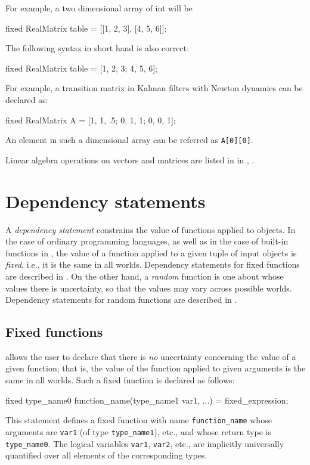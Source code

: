 \documentclass[12pt]{article}
\begin{document}
For example, a two dimensional array of int will be
\begin{blogcode}
fixed RealMatrix table = [[1, 2, 3], [4, 5, 6]];
\end{blogcode}
The following syntax in short hand is also correct:
\begin{blogcode}
fixed RealMatrix table = [1, 2, 3; 4, 5, 6];
\end{blogcode}


For example, a transition matrix in Kalman filters with Newton dynamics can be declared as:
\begin{blogcode}
fixed RealMatrix A = [1, 1, .5; 0, 1, 1; 0, 0, 1];
\end{blogcode}
An element in such a dimensional array can be referred as \texttt{A[0][0]}.



Linear algebra operations on vectors and matrices are listed in
in , .


\section{Dependency statements}\label{dependency-section}

A {\em dependency statement} constrains the value of functions applied to objects. In the case of ordinary programming languages,
as well as in the case of built-in functions in \bl, the value of a function applied to a given tuple of input objects is {\em fixed},
i.e., it is the same in all worlds. Dependency statements for fixed functions are described in . On the other hand, a {\em random} function
is one about whose values there is uncertainty, so that the values may vary across possible worlds. Dependency statements for random functions are described in .

\subsection{Fixed functions}\label{fixed-section}

\bl allows the user to declare that there is {\em no} uncertainty concerning the value of a given function; that is, the
value of the function applied to given arguments is the same in all worlds. Such a fixed function is declared as follows:
\begin{blogcode}
fixed type_name0 function_name(type_name1 var1, ...) = 
  fixed_expression;
\end{blogcode}
This statement defines a fixed function with name \texttt{function\_name} whose arguments are {\tt var1} (of type \verb|type_name1|), etc.,
and whose return type is \verb|type_name0|. The logical variables {\tt var1}, {\tt var2}, etc., are implicitly universally quantified over
all elements of the corresponding types.
\end{document}
